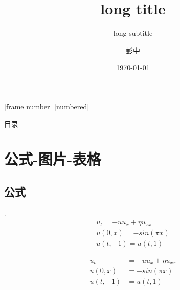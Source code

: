 
[frame number] %
[numbered]%


\title{long title}
\subtitle{long subtitle}
\author{彭中}


\begin{frame}[noframenumbering]
\titlepage
\date{\today}
\end{frame}

\begin{frame}[noframenumbering]{目录}


\tableofcontents%
\end{frame}
\section{公式-图片-表格}
\subsection{公式}
\begin{frame}{\secname  . \subsecname}
	\begin{gather}
		u_t = -uu_x+\eta u_{xx}\\
		u(0,x)=-sin(\pi x)\\
		u(t,-1) = u(t, 1)
	\end{gather}

		\begin{align}
		u_t &= -uu_x+\eta u_{xx}\\
		u(0,x) &=-sin(\pi x)\\
		u(t,-1) & = u(t, 1)
	\end{align}


\end{frame}

